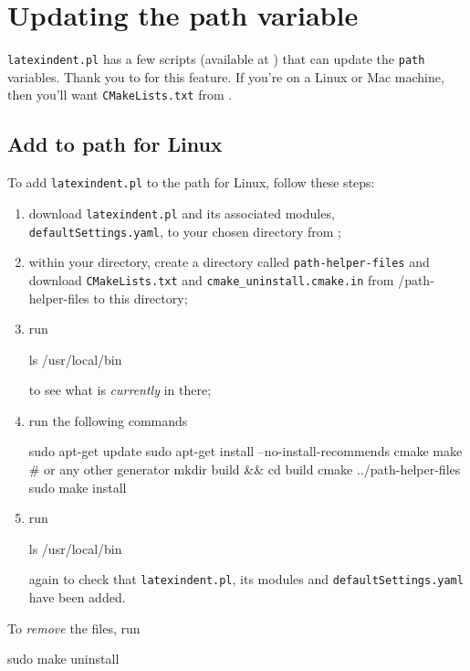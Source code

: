 	\section{Updating the path variable}\label{sec:updating-path}
	 \texttt{latexindent.pl} has a few scripts (available at \cite{latexindent-home}) that can
	 update the \texttt{path} variables. Thank you to \cite{jasjuang} for this feature. If
	 you're on a Linux or Mac machine, then you'll want \texttt{CMakeLists.txt} from
	 \cite{latexindent-home}.
	\subsection{Add to path for Linux}
		To add \texttt{latexindent.pl} to the path for Linux, follow these steps:
		\begin{enumerate}
			\item download \texttt{latexindent.pl} and its associated modules,
			      \texttt{defaultSettings.yaml}, to your chosen directory from \cite{latexindent-home} ;
			\item within your directory, create a directory called \texttt{path-helper-files} and download
			      \texttt{CMakeLists.txt} and \lstinline!cmake_uninstall.cmake.in! from
			      \cite{latexindent-home}/path-helper-files to this directory;
			\item run
			      \begin{commandshell}
ls /usr/local/bin
\end{commandshell}
			      to see what is \emph{currently} in there;
			\item run the following commands
			      \begin{commandshell}
sudo apt-get update
sudo apt-get install --no-install-recommends cmake make # or any other generator
mkdir build && cd build
cmake ../path-helper-files
sudo make install
\end{commandshell}
			\item run
			      \begin{commandshell}
ls /usr/local/bin
\end{commandshell}
			      again to check that \texttt{latexindent.pl}, its modules and
			      \texttt{defaultSettings.yaml} have been added.
		\end{enumerate}
		To \emph{remove} the files, run
		\begin{commandshell}
sudo make uninstall
\end{commandshell}
